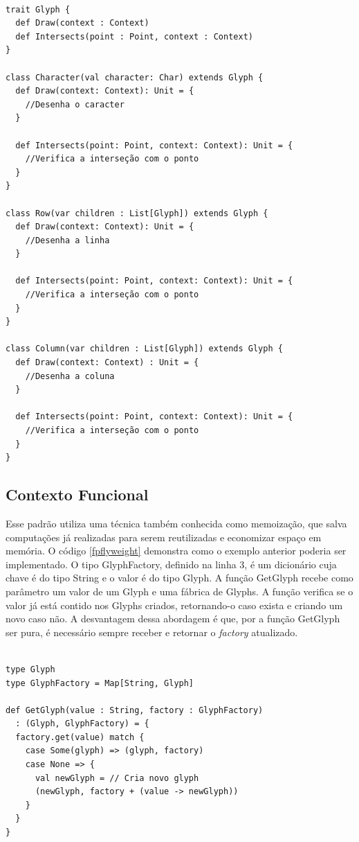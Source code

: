\begin{lstlisting}[caption={Flyweight Orientado a Objetos},label=ooflyweight]

trait Glyph {
  def Draw(context : Context)
  def Intersects(point : Point, context : Context)
}

class Character(val character: Char) extends Glyph {
  def Draw(context: Context): Unit = {
    //Desenha o caracter
  }

  def Intersects(point: Point, context: Context): Unit = {
    //Verifica a interseção com o ponto
  }
}

class Row(var children : List[Glyph]) extends Glyph {
  def Draw(context: Context): Unit = {
    //Desenha a linha
  }

  def Intersects(point: Point, context: Context): Unit = {
    //Verifica a interseção com o ponto
  }
}

class Column(var children : List[Glyph]) extends Glyph {
  def Draw(context: Context) : Unit = {
    //Desenha a coluna
  }

  def Intersects(point: Point, context: Context): Unit = {
    //Verifica a interseção com o ponto
  }
}

\end{lstlisting}

\subsection*{Contexto Funcional}

Esse padrão utiliza uma técnica também conhecida 
como memoização, que salva computações já realizadas 
para serem reutilizadas e economizar espaço em 
memória\cite{scalafunctpatterns}. O código \ref{fpflyweight} 
demonstra como o exemplo anterior poderia ser 
implementado. O tipo GlyphFactory, definido na 
linha 3, é um dicionário cuja chave é do tipo 
String e o valor é do tipo Glyph. A função 
GetGlyph recebe como parâmetro um valor de um 
Glyph e uma fábrica de Glyphs. A função verifica 
se o valor já está contido nos Glyphs criados, 
retornando-o caso exista e criando um novo 
caso não. A desvantagem dessa abordagem é que, 
por a função GetGlyph ser pura, é necessário 
sempre receber e retornar o \textit{factory} 
atualizado.

\begin{lstlisting}[caption={Flyweight Funcional},label=fpflyweight]
    
type Glyph
type GlyphFactory = Map[String, Glyph]

def GetGlyph(value : String, factory : GlyphFactory)
  : (Glyph, GlyphFactory) = {
  factory.get(value) match {
    case Some(glyph) => (glyph, factory)
    case None => {
      val newGlyph = // Cria novo glyph 
      (newGlyph, factory + (value -> newGlyph))
    }
  }
}
    
\end{lstlisting}